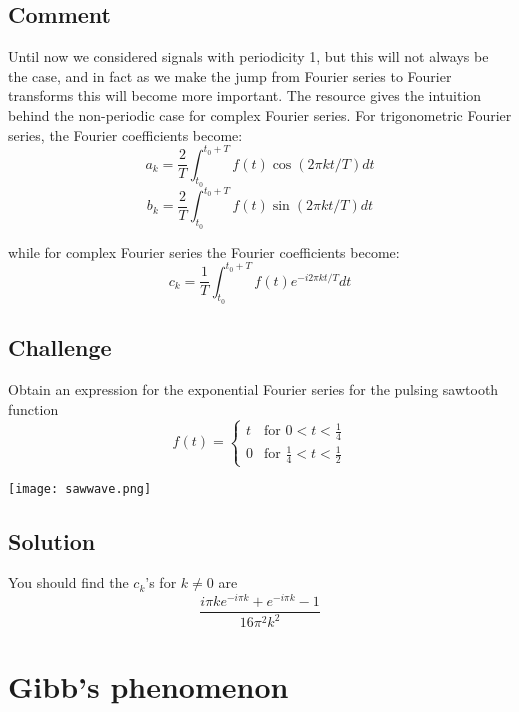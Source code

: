\subsection*{Comment}
Until now we considered signals with periodicity 1, but this will not always be the case, and in fact as we make the jump from Fourier series to Fourier transforms this will become more important. The resource gives the intuition behind the non-periodic case for complex Fourier series. For trigonometric Fourier series, the Fourier coefficients become:
\begin{equation}
    a_k = \frac{2}{T} \int_{t_0}^{t_0+T} f(t) \cos(2 \pi k t/T) dt
\end{equation}
\begin{equation}
    b_k = \frac{2}{T} \int_{t_0}^{t_0+T} f(t) \sin(2 \pi k t/T) dt
\end{equation}

while for complex Fourier series the Fourier coefficients become:
\begin{equation}
    c_k = \frac{1}{T} \int_{t_0}^{t_0+T} f(t) e^{-i 2 \pi kt/T} dt
\end{equation}

\subsection*{Challenge}
Obtain an expression for the exponential Fourier series for the pulsing sawtooth function
\begin{equation}
    f(t)=
    \begin{cases}
        t & \text{for } 0<t<\frac{1}{4} \\
        0 & \text{for } \frac{1}{4}<t<\frac{1}{2}
    \end{cases}
\end{equation}

\texttt{[image: sawwave.png]}

\subsection*{Solution}
You should find the $c_k$'s for $k \ne 0$ are
\begin{equation}
    \frac{i \pi k e^{-i \pi k} + e^{-i \pi k} - 1}{16 \pi^2 k^2}
\end{equation}



\iffalse
\newpage
\section{Gibb's phenomenon}

